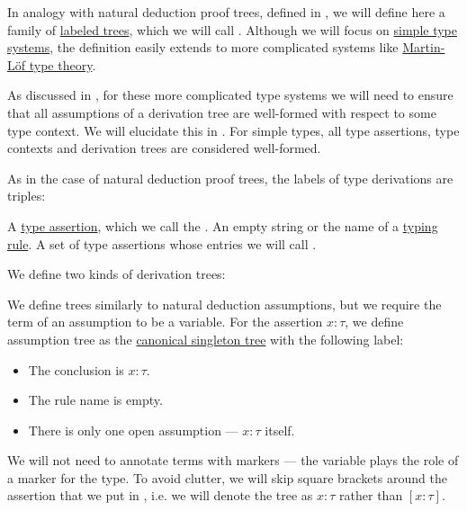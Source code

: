 \begin{definition}\label{def:type_derivation_tree}\mimprovised
  In analogy with natural deduction proof trees, defined in , we will define here a family of \hyperref[def:labeled_tree]{labeled trees}, which we will call . Although we will focus on \hyperref[def:simple_type_system]{simple type systems}, the definition easily extends to more complicated systems like \hyperref[def:mltt]{Martin-L\"of type theory}.

  As discussed in , for these more complicated type systems we will need to ensure that all assumptions of a derivation tree are well-formed with respect to some type context. We will elucidate this in . For simple types, all type assertions, type contexts and derivation trees are considered well-formed.

  As in the case of natural deduction proof trees, the labels of type derivations are triples:
  \begin{thmenum}[series=def:type_derivation_tree]
     A \hyperref[def:type_assertion]{type assertion}, which we call the .
     An empty string or the name of a \hyperref[def:simple_typing_rule]{typing rule}.
     A set of type assertions whose entries we will call .
  \end{thmenum}

  We define two kinds of derivation trees:
  \begin{thmenum}[resume=def:type_derivation_tree]
     We define  trees similarly to natural deduction assumptions, but we require the term of an assumption to be a variable. For the assertion \( x: \tau \), we define assumption tree as the \hyperref[def:canonical_singleton_tree]{canonical singleton tree} with the following label:
    \begin{itemize}
      \item The conclusion is \( x: \tau \).
      \item The rule name is empty.
      \item There is only one open assumption --- \( x: \tau \) itself.
    \end{itemize}

    We will not need to annotate terms with markers --- the variable plays the role of a marker for the type. To avoid clutter, we will skip square brackets around the assertion that we put in , i.e. we will denote the tree as \( x: \tau \) rather than \( [x: \tau] \).


\end{thmenum}
\end{definition}
